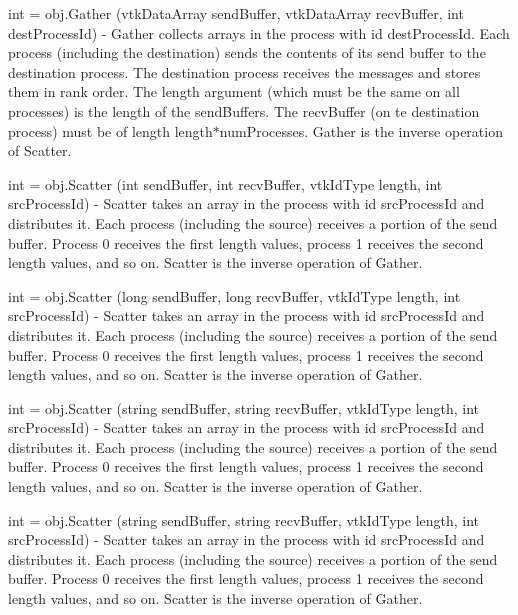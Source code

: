 \begin{DoxyItemize}
\item {\ttfamily int = obj.\-Gather (vtk\-Data\-Array send\-Buffer, vtk\-Data\-Array recv\-Buffer, int dest\-Process\-Id)} -\/ Gather collects arrays in the process with id {\ttfamily dest\-Process\-Id}. Each process (including the destination) sends the contents of its send buffer to the destination process. The destination process receives the messages and stores them in rank order. The {\ttfamily length} argument (which must be the same on all processes) is the length of the send\-Buffers. The {\ttfamily recv\-Buffer} (on te destination process) must be of length length$\ast$num\-Processes. Gather is the inverse operation of Scatter.  
\item {\ttfamily int = obj.\-Scatter (int send\-Buffer, int recv\-Buffer, vtk\-Id\-Type length, int src\-Process\-Id)} -\/ Scatter takes an array in the process with id {\ttfamily src\-Process\-Id} and distributes it. Each process (including the source) receives a portion of the send buffer. Process 0 receives the first {\ttfamily length} values, process 1 receives the second {\ttfamily length} values, and so on. Scatter is the inverse operation of Gather.  
\item {\ttfamily int = obj.\-Scatter (long send\-Buffer, long recv\-Buffer, vtk\-Id\-Type length, int src\-Process\-Id)} -\/ Scatter takes an array in the process with id {\ttfamily src\-Process\-Id} and distributes it. Each process (including the source) receives a portion of the send buffer. Process 0 receives the first {\ttfamily length} values, process 1 receives the second {\ttfamily length} values, and so on. Scatter is the inverse operation of Gather.  
\item {\ttfamily int = obj.\-Scatter (string send\-Buffer, string recv\-Buffer, vtk\-Id\-Type length, int src\-Process\-Id)} -\/ Scatter takes an array in the process with id {\ttfamily src\-Process\-Id} and distributes it. Each process (including the source) receives a portion of the send buffer. Process 0 receives the first {\ttfamily length} values, process 1 receives the second {\ttfamily length} values, and so on. Scatter is the inverse operation of Gather.  
\item {\ttfamily int = obj.\-Scatter (string send\-Buffer, string recv\-Buffer, vtk\-Id\-Type length, int src\-Process\-Id)} -\/ Scatter takes an array in the process with id {\ttfamily src\-Process\-Id} and distributes it. Each process (including the source) receives a portion of the send buffer. Process 0 receives the first {\ttfamily length} values, process 1 receives the second {\ttfamily length} values, and so on. Scatter is the inverse operation of Gather.  

\end{DoxyItemize}
